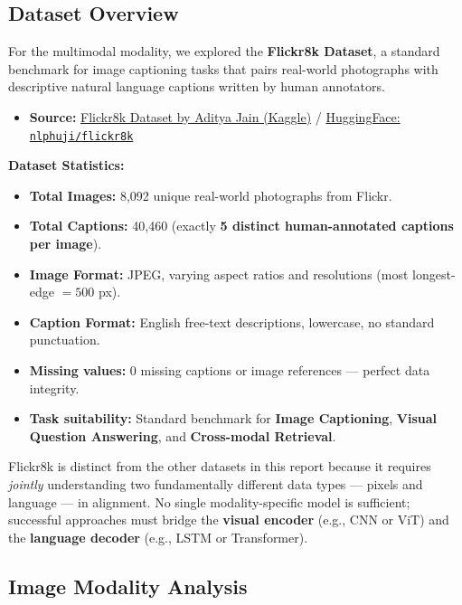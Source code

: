 \documentclass[twoside]{hcmut-report}
\begin{document}
\subsection{Dataset Overview}
For the multimodal modality, we explored the \textbf{Flickr8k Dataset}, a standard benchmark for image captioning tasks that pairs real-world photographs with descriptive natural language captions written by human annotators.

\begin{itemize}
    \item \textbf{Source:} \href{https://www.kaggle.com/datasets/adityajn105/flickr8k}{Flickr8k Dataset by Aditya Jain (Kaggle)} / \href{https://huggingface.co/datasets/nlphuji/flickr8k}{HuggingFace: \texttt{nlphuji/flickr8k}}
\end{itemize}

\begin{importantbox}
\textbf{Dataset Statistics:}
\begin{itemize}
    \item \textbf{Total Images:} 8{,}092 unique real-world photographs from Flickr.
    \item \textbf{Total Captions:} 40{,}460 (exactly \textbf{5 distinct human-annotated captions per image}).
    \item \textbf{Image Format:} JPEG, varying aspect ratios and resolutions (most longest-edge $= 500$ px).
    \item \textbf{Caption Format:} English free-text descriptions, lowercase, no standard punctuation.
    \item \textbf{Missing values:} 0 missing captions or image references --- perfect data integrity.
    \item \textbf{Task suitability:} Standard benchmark for \textbf{Image Captioning}, \textbf{Visual Question Answering}, and \textbf{Cross-modal Retrieval}.
\end{itemize}
\end{importantbox}

Flickr8k is distinct from the other datasets in this report because it requires \emph{jointly} understanding two fundamentally different data types --- pixels and language --- in alignment. No single modality-specific model is sufficient; successful approaches must bridge the \textbf{visual encoder} (e.g., CNN or ViT) and the \textbf{language decoder} (e.g., LSTM or Transformer).

\subsection{Image Modality Analysis}
\end{document}
